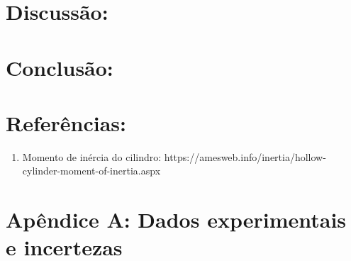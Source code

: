 \documentclass[hidelinks,a4paper,12pt]{article}
\begin{document}
\section*{Discussão:}

\section*{Conclusão:}

\section*{Referências:}
\begin{enumerate}
    \item Momento de inércia do cilindro: https://amesweb.info/inertia/hollow-cylinder-moment-of-inertia.aspx
\end{enumerate}

\section*{Apêndice A: Dados experimentais e incertezas}
\end{document}
